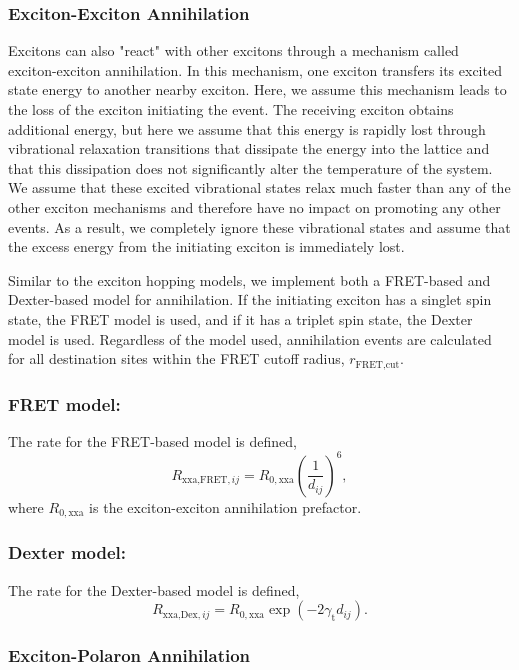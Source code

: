 \documentclass[%
 reprint,onecolumn,notitlepage,
superscriptaddress,longbibliography,
 amsmath,amssymb,
 aps,rmp,floatfix,
]{revtex4-1}
\begin{document}
\subsubsection{Exciton-Exciton Annihilation}

Excitons can also "react" with other excitons through a mechanism called exciton-exciton annihilation.
In this mechanism, one exciton transfers its excited state energy to another nearby exciton.
Here, we assume this mechanism leads to the loss of the exciton initiating the event.
The receiving exciton obtains additional energy, but here we assume that this energy is rapidly lost through vibrational relaxation transitions that dissipate the energy into the lattice and that this dissipation does not significantly alter the temperature of the system.
We assume that these excited vibrational states relax much faster than any of the other exciton mechanisms and therefore have no impact on promoting any other events.
As a result, we completely ignore these vibrational states and assume that the excess energy from the initiating exciton is immediately lost.

Similar to the exciton hopping models, we implement both a FRET-based and Dexter-based model for annihilation. 
If the initiating exciton has a singlet spin state, the FRET model is used, and if it has a triplet spin state, the Dexter model is used.
Regardless of the model used, annihilation events are calculated for all destination sites within the FRET cutoff radius, $r_{\text{FRET,cut}}$.

\subsubsection*{\textbf{FRET model:}}

The rate for the FRET-based model is defined,
$$R_{\text{xxa,FRET},ij} = R_{0,\text{xxa}} \left( \frac{1}{d_{ij}} \right)^6,$$
where $R_{0,\text{xxa}}$ is the exciton-exciton annihilation prefactor. 

\subsubsection*{\textbf{Dexter model:}}

The rate for the Dexter-based model is defined,
$$R_{\text{xxa,Dex},ij} = R_{0,\text{xxa}} \exp{\left(- 2 \gamma_{\text{t}} d_{ij} \right)}.$$

\subsubsection{Exciton-Polaron Annihilation}
\end{document}
